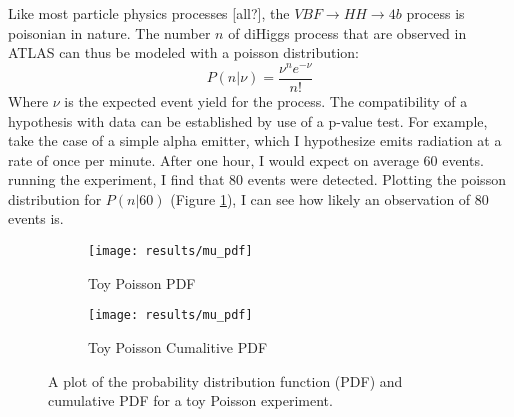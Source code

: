     Like most particle physics processes [all?], the $VBF \to HH \to 4b$ process is poisonian in nature.
    The number $n$ of diHiggs process that are observed in ATLAS can thus be modeled with a poisson distribution:
    \begin{equation}
        P(n|\nu) = \frac{ \nu^n e^{-\nu} }{n!}
    \end{equation}
    Where $\nu$ is the expected event yield for the process.
    The compatibility of a hypothesis with data can be established by use of a p-value test.
    For example, take the case of a simple alpha emitter,
        which I hypothesize emits radiation at a rate of once per minute.
    After one hour, I would expect on average 60 events.
    running the experiment, I find that 80 events were detected.
    Plotting the poisson distribution for $P(n|60)$ (Figure \ref{fig:poisson_toy_sig:pdf}),
        I can see how likely an observation of 80 events is.

    \begin{figure} %
        \centering
        \begin{subfigure}{0.48\textwidth} 
            \texttt{[image: results/mu\_pdf]}
            \caption{Toy Poisson PDF}
            \label{fig:poisson_toy_sig:pdf}
        \end{subfigure}
        \begin{subfigure}{0.48\textwidth}
            \texttt{[image: results/mu\_pdf]}
            \caption{Toy Poisson Cumalitive PDF}
            \label{fig:poisson_toy_sig:Cpdf}
        \end{subfigure}
        \caption{
            A plot of the probability distribution function (PDF)
                and cumulative PDF for a toy Poisson experiment.
        }
    \end{figure}

